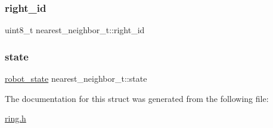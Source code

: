 \subsubsection{\texorpdfstring{right\+\_\+id}{right\_id}}
{\footnotesize\ttfamily uint8\+\_\+t nearest\+\_\+neighbor\+\_\+t\+::right\+\_\+id}

\mbox{\label{structnearest__neighbor__t_a6888323805aed698b5485548a6b17390}} 
\subsubsection{\texorpdfstring{state}{state}}
{\footnotesize\ttfamily \hyperlink{ring_8h_a69b20b1a04c8e4cf3b72851b966259ec}{robot\+\_\+state} nearest\+\_\+neighbor\+\_\+t\+::state}



The documentation for this struct was generated from the following file\+:\begin{DoxyCompactItemize}
\item 
\hyperlink{ring_8h}{ring.\+h}\end{DoxyCompactItemize}
